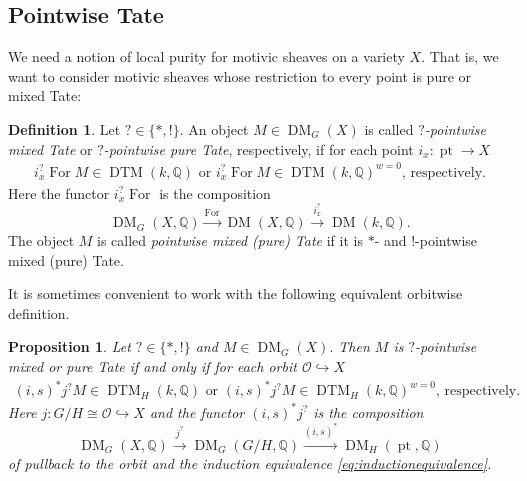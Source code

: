 \documentclass{amsart}
\theoremstyle{plain}
\newtheorem{proposition}[theorem]{Proposition}
\theoremstyle{TheoremNum}
\theoremstyle{definition}
\newtheorem{definition}[theorem]{Definition}
\theoremstyle{remark}
\newtheorem{remark}[theorem]{Remark}
\numberwithin{equation}{section}
\newcommand{\Q}{\mathbb{Q}}
\newcommand{\DM}{\operatorname{DM}}
\newcommand{\DTM}{\operatorname{DTM}}
\newcommand{\For}{\operatorname{For}}
\newcommand{\poi}{\operatorname{pt}}
\begin{document}
\subsection{Pointwise Tate}\label{sec:pointwisetate}
We need a notion of local purity for motivic sheaves on a variety $X.$ That is, we want to consider motivic sheaves whose restriction to every point is pure or mixed Tate:
\begin{definition} Let $?\in \{*,!\}.$
An object $M\in \DM_G(X)$ is called \emph{$?$-pointwise mixed Tate} or \emph{$?$-pointwise pure Tate}, respectively, if for each point $i_x:\poi\to X$
\begin{align*}
    i_x^?\For M\in \DTM(k,\Q) \text{ or }
    i_x^?\For M\in \DTM(k,\Q)^{w=0} \text{, respectively.}
\end{align*}
Here the functor $i_x^?\For$ is the composition 
$$\DM_G(X,\Q)\stackrel{\For}{\to}\DM(X,\Q)\stackrel{i_x^?}{\to}\DM(k,\Q).$$ The object $M$ is called \emph{pointwise mixed (pure) Tate} if it is $*$- and $!$-pointwise mixed (pure) Tate.
\end{definition}
It is sometimes convenient to work with the following equivalent orbitwise definition.
\begin{proposition} Let $?\in\{*,!\}$ and $M\in \DM_G(X).$ Then $M$ is $?$-pointwise mixed or pure Tate if and only if for each orbit $\mathcal{O}\hookrightarrow X$
\begin{align*}
    (i,s)^*j^?M\in\DTM_H(k,\Q) \text{ or }
    (i,s)^*j^?M\in\DTM_H(k,\Q)^{w=0} \text{, respectively.}
\end{align*}
Here $j:G/H\cong\mathcal{O}\hookrightarrow X$ and the functor $(i,s)^*j^?$ is the composition 
$$\DM_G(X,\Q)\stackrel{j^?}{\to}\DM_G(G/H,\Q)\stackrel{(i,s)^*}{\to}\DM_H(\poi,\Q)$$ of pullback to the orbit and the induction equivalence \eqref{eq:inductionequivalence}.
\end{proposition}
\end{document}
